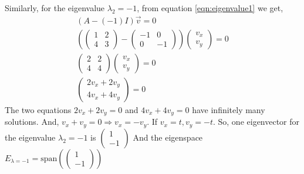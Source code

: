 \documentclass[conference,final,11pt,technote,onecolumn]{IEEEtran}\usepackage[]{graphicx}\usepackage[]{color}
\begin{document}
Similarly, for the eigenvalue $\lambda_2 = -1$, from equation \ref{eqn:eigenvalue1} we get,
\begin{eqnarray}
\nonumber (A- (-1)I)\vec v = 0\\
\nonumber (\begin{pmatrix}1 & 2\\4 & 3 \end{pmatrix} - \begin{pmatrix}-1 & 0\\0 & -1\end{pmatrix})\begin{pmatrix}v_x\\v_y\end{pmatrix} = 0\\
\nonumber \begin{pmatrix}2 & 2\\4 & 4\end{pmatrix}\begin{pmatrix}v_x\\v_y\end{pmatrix} = 0\\
\nonumber \begin{pmatrix}2v_x+2v_y\\4v_x+4v_y\end{pmatrix} = 0
\end{eqnarray}
The two equations $2v_x+2v_y = 0$ and $4v_x+4v_y = 0$ have infinitely many solutions. And, $v_x+v_y = 0 \Rightarrow v_x = -v_y$. If $v_x = t, v_y=-t$.
So, one eigenvector for the eigenvalue $\lambda_2 = -1$ is $\begin{pmatrix}1 \\ -1\end{pmatrix}$ And the eigenspace $E_{\lambda=-1} = \text{span}(\begin{pmatrix}1 \\ -1\end{pmatrix})$
\end{document}
